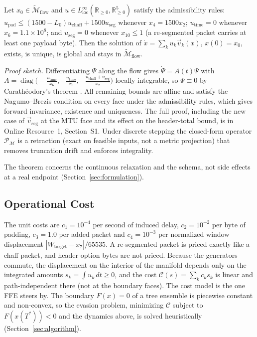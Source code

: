 \begin{theorem}
\label{thm:invariant_universal}
Let $x_0\in\widetilde{\mathcal{M}}_{\text{flow}}$ and $u\in L^\infty_{\text{loc}}(\mathbb{R}_{\ge0},\mathbb{R}^5_{\ge0})$ satisfy the admissibility rules: $u_{\text{pad}}\le(1500-L_0)u_{\text{chaff}}+1500u_{\text{seg}}$ whenever $x_4=1500x_2$; $u_{\text{time}}=0$ whenever $x_6=1.1\times10^8$; and $u_{\text{seg}}=0$ whenever $x_{10}\le1$ (a re-segmented packet carries at least one payload byte). Then the solution of $\dot x=\sum_ku_k\vec v_k(x)$, $x(0)=x_0$, exists, is unique, is global and stays in $\widetilde{\mathcal{M}}_{\text{flow}}$.
\end{theorem}
\noindent\textit{Proof sketch.} Differentiating $\Psi$ along the flow gives $\dot\Psi=A(t)\Psi$ with $A=\operatorname{diag}\!\big(-\tfrac{u_{\text{time}}}{x_6},-\tfrac{u_{\text{time}}}{x_6},-\tfrac{u_{\text{chaff}}+u_{\text{seg}}}{x_2}\big)$ locally integrable, so $\Psi\equiv0$ by Carath\'eodory's theorem \cite{caratheodory1918vorlesungen}. All remaining bounds are affine and satisfy the Nagumo--Brezis condition \cite{nagumo1942lage, brezis1970characterization} on every face under the admissibility rules, which gives forward invariance, existence and uniqueness. The full proof, including the new case of $\vec v_{\text{seg}}$ at the MTU face and its effect on the header-total bound, is in Online Resource~1, Section~S1. Under discrete stepping the closed-form operator $\mathcal{P}_{\mathcal{M}}$ is a retraction (exact on feasible inputs, not a metric projection) that removes truncation drift and enforces integrality.

The theorem concerns the continuous relaxation and the schema, not side effects at a real endpoint (Section~\ref{sec:formulation}).

\subsection{Operational Cost}
\label{sec:cost}

The unit costs are $c_1=10^{-4}$ per second of induced delay, $c_2=10^{-2}$ per byte of padding, $c_3=1.0$ per added packet and $c_4=10^{-3}$ per normalized window displacement $|W_{\text{target}}-x_7|/65535$. A re-segmented packet is priced exactly like a chaff packet, and header-option bytes are not priced. Because the generators commute, the displacement on the interior of the manifold depends only on the integrated amounts $s_k=\int u_k\,dt\ge0$, and the cost $\mathcal{C}(s)=\sum_kc_ks_k$ is linear and path-independent there (not at the boundary faces). The cost model is the one FFE steers by. The boundary $F(x)=0$ of a tree ensemble is piecewise constant and non-convex, so the evasion problem, minimizing $\mathcal{C}$ subject to $F(x(T^*))<0$ and the dynamics above, is solved heuristically (Section~\ref{sec:algorithm}).

